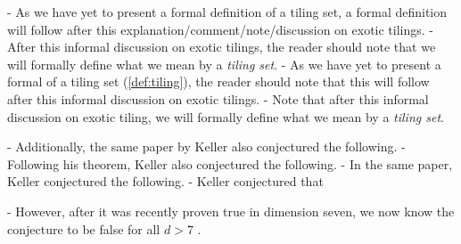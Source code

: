 




- As we have yet to present a formal definition of a tiling set, a formal definition will follow after this explanation/comment/note/discussion on exotic tilings. 
- After this informal discussion on exotic tilings, the reader should note that we will formally define what we mean by a \emph{tiling set}. 
- As we have yet to present a formal  of a tiling set (\cref{def:tiling}), the reader should note that this will follow after this informal discussion on exotic tilings. 
- Note that after this informal discussion on exotic tiling, we will formally define what we mean by a \emph{tiling set}. 

- Additionally, the same paper by Keller also conjectured the following. 
- Following his theorem, Keller also conjectured the following. 
- In the same paper, Keller conjectured the following. 
- Keller conjectured that



- However, after it was recently proven true in dimension seven, we now know the conjecture to be false for all $d>7$ \cite{brakensiekResolutionKellerConjecture2020}. 

